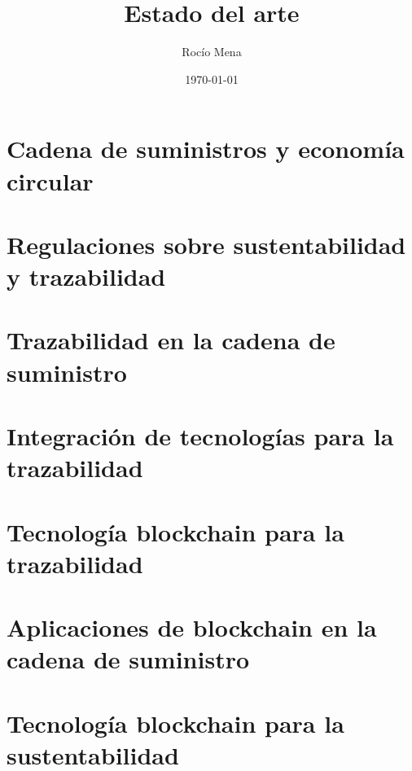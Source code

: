 \documentclass{article}
\title{Estado del arte}
\author{Rocío Mena}
\date{\today}
\begin{document}
\maketitle

\section{Cadena de suministros y economía circular}

\section{Regulaciones sobre sustentabilidad y trazabilidad}

\section{Trazabilidad en la cadena de suministro}

\section{Integración de tecnologías para la trazabilidad}

\section{Tecnología blockchain para la trazabilidad}

\section{Aplicaciones de blockchain en la cadena de suministro}

\section{Tecnología blockchain para la sustentabilidad}
\end{document}

